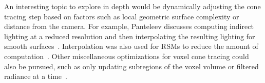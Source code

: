 An interesting topic to explore in depth would be dynamically adjusting the cone tracing step based on factors such as local geometric surface complexity or distance from the camera. For example, Panteleev discusses computing indirect lighting at a reduced resolution and then interpolating the resulting lighting for smooth surfaces~\cite{practicalvxgi}. Interpolation was also used for RSMs to reduce the amount of computation~\cite{Dachsbacher:2005:RSM:1053427.1053460}. Other miscellaneous optimizations for voxel cone tracing could also be pursued, such as only updating subregions of the voxel volume or filtered radiance at a time~\cite{mclaren2016cascaded}.


